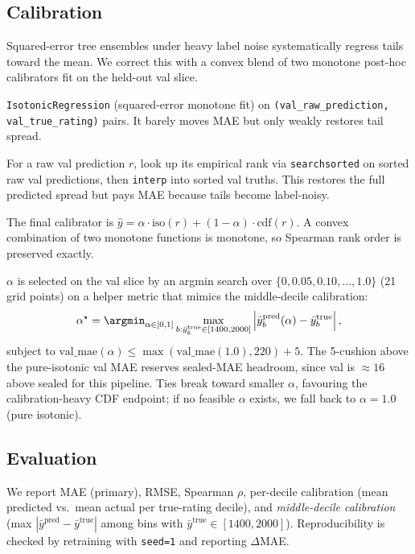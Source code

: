 \subsection{Calibration}
\label{sec:calibration}
Squared-error tree ensembles under heavy label noise systematically regress tails toward the mean. We correct this with a convex blend of two monotone post-hoc calibrators fit on the held-out val slice.

 \texttt{IsotonicRegression} (squared-error monotone fit) on \texttt{(val\_raw\_prediction, val\_true\_rating)} pairs. It barely moves MAE but only weakly restores tail spread.

 For a raw val prediction $r$, look up its empirical rank via \texttt{searchsorted} on sorted raw val predictions, then \texttt{interp} into sorted val truths. This restores the full predicted spread but pays MAE because tails become label-noisy.

 The final calibrator is $\hat{y} = \alpha \cdot \text{iso}(r) + (1 - \alpha) \cdot \text{cdf}(r)$. A convex combination of two monotone functions is monotone, so Spearman rank order is preserved exactly.

$\alpha$ is selected on the val slice by an argmin search over $\{0, 0.05, 0.10, \ldots, 1.0\}$ (21 grid points) on a helper metric that mimics the middle-decile calibration:
$$\alpha^\star = \argmin_{\alpha \in [0, 1]} \max_{b : \bar{y}^{\text{true}}_b \in [1400, 2000]} \left| \bar{y}^{\text{pred}}_b(\alpha) - \bar{y}^{\text{true}}_b \right|,$$
subject to $\text{val\_mae}(\alpha) \leq \max(\text{val\_mae}(1.0), 220) + 5$. The 5-\elo cushion above the pure-isotonic val MAE reserves sealed-MAE headroom, since val is $\approx 16$ \elo above sealed for this pipeline. Ties break toward smaller $\alpha$, favouring the calibration-heavy CDF endpoint; if no feasible $\alpha$ exists, we fall back to $\alpha = 1.0$ (pure isotonic).

\subsection{Evaluation}
\label{sec:eval}
We report MAE (primary), RMSE, Spearman $\rho$, per-decile calibration (mean predicted vs.\ mean actual per true-rating decile), and \emph{middle-decile calibration} (max $|\bar{y}^{\text{pred}} - \bar{y}^{\text{true}}|$ among bins with $\bar{y}^{\text{true}} \in [1400, 2000]$). Reproducibility is checked by retraining with \texttt{seed=1} and reporting $\Delta$MAE.
